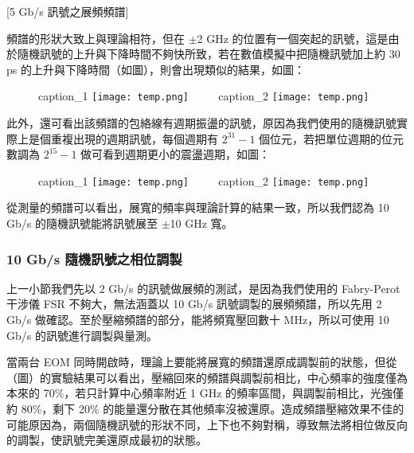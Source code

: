 \documentclass[class=NCU_thesis, crop=false]{standalone}
\begin{document}
[5 Gb/s 訊號之展頻頻譜]

頻譜的形狀大致上與理論相符，但在 $\pm$2 GHz 的位置有一個突起的訊號，這是由於隨機訊號的上升與下降時間不夠快所致，若在數值模擬中把隨機訊號加上約 30 ps 的上升與下降時間（如圖），則會出現類似的結果，如圖：

\begin{figure}[!hbt]
    \centering
    \subcaptionbox
        {caption\_1
        \label{fig:subfig_fig1}}
        {\texttt{[image: temp.png]}}
    ~~~~
    \subcaptionbox
        {caption\_2
        \label{fig:subfig_fig2}}
        {\texttt{[image: temp.png]}}
\end{figure}


此外，還可看出該頻譜的包絡線有週期振盪的訊號，原因為我們使用的隨機訊號實際上是個重複出現的週期訊號，每個週期有 $2^{31}-1$ 個位元，若把單位週期的位元數調為 $2^{15}-1$ 做可看到週期更小的震盪週期，如圖：

\begin{figure}[!hbt]
    \centering
    \subcaptionbox
        {caption\_1
        \label{fig:subfig_fig1}}
        {\texttt{[image: temp.png]}}
    ~~~~
    \subcaptionbox
        {caption\_2
        \label{fig:subfig_fig2}}
        {\texttt{[image: temp.png]}}
\end{figure}

從測量的頻譜可以看出，展寬的頻率與理論計算的結果一致，所以我們認為 10 Gb/s 的隨機訊號能將訊號展至 $\pm$10 GHz 寬。

\subsubsection{10 Gb/s 隨機訊號之相位調製}

上一小節我們先以 2 Gb/s 的訊號做展頻的測試，是因為我們使用的 Fabry-Perot 干涉儀 FSR 不夠大，無法涵蓋以 10 Gb/s 訊號調製的展頻頻譜，所以先用 2 Gb/s 做確認。至於壓縮頻譜的部分，能將頻寬壓回數十 MHz，所以可使用 10 Gb/s 的訊號進行調製與量測。

當兩台 EOM 同時開啟時，理論上要能將展寬的頻譜還原成調製前的狀態，但從（圖）的實驗結果可以看出，壓縮回來的頻譜與調製前相比，中心頻率的強度僅為本來的 70\%，若只計算中心頻率附近 1 GHz 的頻率區間，與調製前相比，光強僅約 80\%，剩下 20\% 的能量還分散在其他頻率沒被還原。造成頻譜壓縮效果不佳的可能原因為，兩個隨機訊號的形狀不同，上下也不夠對稱，導致無法將相位做反向的調製，使訊號完美還原成最初的狀態。
\end{document}
